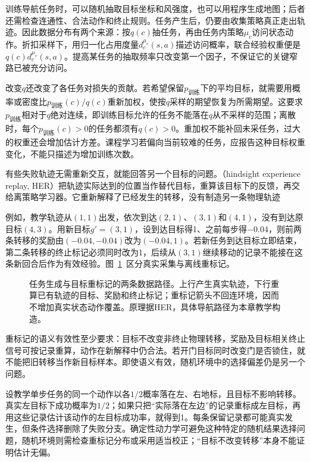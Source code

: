 训练导航任务时，可以随机抽取目标坐标和风强度，也可以用程序生成地图；后者还需检查连通性、合法动作和终止规则。任务产生后，仍要由收集策略真正走出轨迹。因此数据分布有两个来源：按$q(c)$抽任务，再由任务内策略$\mu_c$访问状态动作。折扣采样下，用归一化占用度量$d_c^{\mu_c}(s,a)$描述访问概率，联合经验权重便是$q(c)d_c^{\mu_c}(s,a)$。提高某任务的抽取频率只改变第一个因子，不保证它的关键窄路已被充分访问。

改变$q$还改变了各任务对损失的贡献。若希望保留$p_{\text{训练}}$下的平均目标，就需要用概率或密度比$p_{\text{训练}}(c)/q(c)$重新加权，使按$q$采样的期望恢复为所需期望。这要求$p_{\text{训练}}$相对于$q$绝对连续，即训练目标允许的任务不能落在$q$从不采样的范围；离散时，每个$p_{\text{训练}}(c)>0$的任务都须有$q(c)>0$。重加权不能补回未采任务，过大的权重还会增加估计方差。课程学习若偏向当前较难的任务，应报告这种目标权重变化，不能只描述为增加训练次数。

有些失败轨迹无需重新交互，就能回答另一个目标的问题。（hindsight experience replay, HER）把轨迹实际达到的位置当作替代目标，重算该目标下的反馈，再交给离策略学习器。它重新解释了已经发生的转移，没有制造另一条物理轨迹

例如，教学轨迹从$(1,1)$出发，依次到达$(2,1)$、$(3,1)$和$(4,1)$，没有到达原目标$(4,3)$。用新目标$g'=(3,1)$，设到达目标得1、之前每步得$-0.04$，则前两条转移的奖励由$(-0.04,-0.04)$改为$(-0.04,1)$。若新任务到达目标立即结束，第二条转移的终止标记必须同时改为1，后续从$(3,1)$继续移动的记录不能接在这条新回合后作为有效经验。图~\ref{fig:rl-transfer-relabel}~区分真实采集与离线重标记。

\begin{figure}[htbp]
  \centering
  
  \caption{任务生成与目标重标记的两条数据路径。上行产生真实轨迹，下行重算已有轨迹的目标、奖励和终止标记；重标记箭头不回连环境，因而不增加真实状态动作覆盖。原理据HER，具体导航路径为本章教学构造。}
  \label{fig:rl-transfer-relabel}
\end{figure}

重标记的语义有效性至少要求：目标不改变非终止物理转移，奖励及目标相关终止信号可按记录重算，动作在新解释中仍合法。若开门目标同时改变门是否锁住，就不能把旧转移当作新目标样本。即使语义有效，随机环境中的选择偏差仍是另一个问题。

设教学单步任务的同一个动作以各$1/2$概率落在左、右地标，且目标不影响转移。真实左目标下成功概率为$1/2$；如果只把“实际落在左边”的记录重标成左目标，再用这些记录估计该动作的左目标成功率，就得到1。每条保留记录都可能真实发生，但条件选择删除了失败分支。确定性动力学可避免这种特定的随机结果选择问题，随机环境则需检查重标记分布或采用适当校正；“目标不改变转移”本身不能证明估计无偏。


